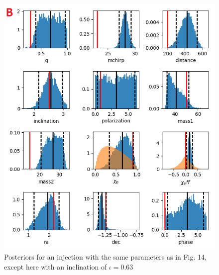 \documentclass[11pt]{article}
\begin{document}
\begin{figure}
	\includegraphics[width=1\textwidth]{fig15.png}
	\centering
	\caption{Posteriors for an injection with the same parameters as in Fig. 14, except here with an inclination of $\iota=0.63$}
	\centering
\end{figure}
\end{document}
